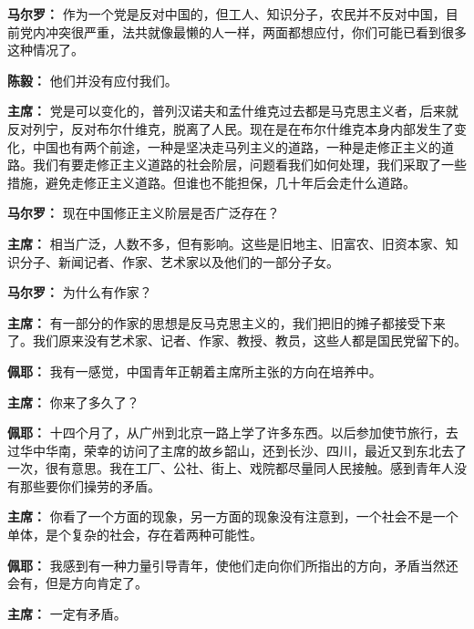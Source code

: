 \begin{list}{}
\item[\textbf{马尔罗：}] 作为一个党是反对中国的，但工人、知识分子，农民并不反对中国，目前党内冲突很严重，法共就像最懒的人一样，两面都想应付，你们可能已看到很多这种情况了。

\item[\textbf{陈毅：}] 他们并没有应付我们。

\item[\textbf{主席：}] 党是可以变化的，普列汉诺夫和孟什维克过去都是马克思主义者，后来就反对列宁，反对布尔什维克，脱离了人民。现在是在布尔什维克本身内部发生了变化，中国也有两个前途，一种是坚决走马列主义的道路，一种是走修正主义的道路。我们有要走修正主义道路的社会阶层，问题看我们如何处理，我们采取了一些措施，避免走修正主义道路。但谁也不能担保，几十年后会走什么道路。

\item[\textbf{马尔罗：}] 现在中国修正主义阶层是否广泛存在？

\item[\textbf{主席：}] 相当广泛，人数不多，但有影响。这些是旧地主、旧富农、旧资本家、知识分子、新闻记者、作家、艺术家以及他们的一部分子女。

\item[\textbf{马尔罗：}] 为什么有作家？

\item[\textbf{主席：}] 有一部分的作家的思想是反马克思主义的，我们把旧的摊子都接受下来了。我们原来没有艺术家、记者、作家、教授、教员，这些人都是国民党留下的。

\item[\textbf{佩耶：}] 我有一感觉，中国青年正朝着主席所主张的方向在培养中。

\item[\textbf{主席：}] 你来了多久了？

\item[\textbf{佩耶：}] 十四个月了，从广州到北京一路上学了许多东西。以后参加使节旅行，去过华中华南，荣幸的访问了主席的故乡韶山，还到长沙、四川，最近又到东北去了一次，很有意思。我在工厂、公社、街上、戏院都尽量同人民接触。感到青年人没有那些要你们操劳的矛盾。

\item[\textbf{主席：}] 你看了一个方面的现象，另一方面的现象没有注意到，一个社会不是一个单体，是个复杂的社会，存在着两种可能性。

\item[\textbf{佩耶：}] 我感到有一种力量引导青年，使他们走向你们所指出的方向，矛盾当然还会有，但是方向肯定了。

\item[\textbf{主席：}] 一定有矛盾。


\end{list}
